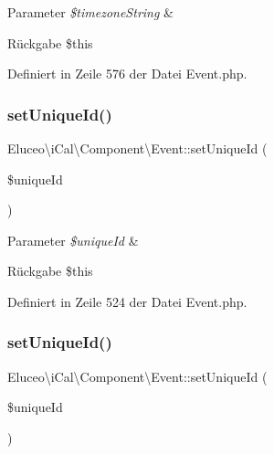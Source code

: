 \begin{DoxyParams}{Parameter}
{\em \$timezone\+String} & \\
\hline
\end{DoxyParams}
\begin{DoxyReturn}{Rückgabe}
\$this 
\end{DoxyReturn}


Definiert in Zeile 576 der Datei Event.\+php.

\mbox{\label{class_eluceo_1_1i_cal_1_1_component_1_1_event_ad71076351bbd5720b266b021d92d61cc}} 
\subsubsection{\texorpdfstring{set\+Unique\+Id()}{setUniqueId()}\hspace{0.1cm}{\footnotesize\ttfamily [1/3]}}
{\footnotesize\ttfamily Eluceo\textbackslash{}i\+Cal\textbackslash{}\+Component\textbackslash{}\+Event\+::set\+Unique\+Id (\begin{DoxyParamCaption}\item[{}]{\$unique\+Id }\end{DoxyParamCaption})}


\begin{DoxyParams}{Parameter}
{\em \$unique\+Id} & \\
\hline
\end{DoxyParams}
\begin{DoxyReturn}{Rückgabe}
\$this 
\end{DoxyReturn}


Definiert in Zeile 524 der Datei Event.\+php.

\mbox{\label{class_eluceo_1_1i_cal_1_1_component_1_1_event_ad71076351bbd5720b266b021d92d61cc}} 
\subsubsection{\texorpdfstring{set\+Unique\+Id()}{setUniqueId()}\hspace{0.1cm}{\footnotesize\ttfamily [2/3]}}
{\footnotesize\ttfamily Eluceo\textbackslash{}i\+Cal\textbackslash{}\+Component\textbackslash{}\+Event\+::set\+Unique\+Id (\begin{DoxyParamCaption}\item[{}]{\$unique\+Id }\end{DoxyParamCaption})}


